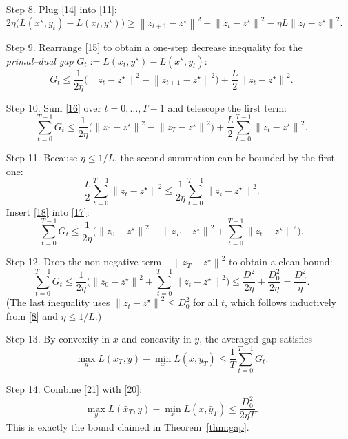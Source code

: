 \documentclass{article}
\newcommand{\norm}[1]{\left\lVert#1\right\rVert}
\begin{document}
\begin{enumerate}
\item[Step 8.] Plug \eqref{14} into \eqref{11}:
\[
2\eta\big(L(x^{\star},y_t)-L(x_t,y^{\star})\big)
\ge \norm{z_{t+1}-z^{\star}}^{2}-\norm{z_t-z^{\star}}^{2}-\eta L \norm{z_t-z^{\star}}^{2}.
\tag{15}
\]

\item[Step 9.] Rearrange \eqref{15} to obtain a one‑step decrease inequality for the \emph{primal–dual gap} $G_t:=L(x_t,y^{\star})-L(x^{\star},y_t)$:
\[
G_t\le \frac{1}{2\eta}\Big(\norm{z_t-z^{\star}}^{2}-\norm{z_{t+1}-z^{\star}}^{2}\Big)+\frac{L}{2}\norm{z_t-z^{\star}}^{2}.
\tag{16}
\]

\item[Step 10.] Sum \eqref{16} over $t=0,\dots,T-1$ and telescope the first term:
\[
\sum_{t=0}^{T-1}G_t
\le \frac{1}{2\eta}\big(\norm{z_0-z^{\star}}^{2}-\norm{z_T-z^{\star}}^{2}\big)
+\frac{L}{2}\sum_{t=0}^{T-1}\norm{z_t-z^{\star}}^{2}.
\tag{17}
\]

\item[Step 11.] Because $\eta\le 1/L$, the second summation can be bounded by the first one:
\[
\frac{L}{2}\sum_{t=0}^{T-1}\norm{z_t-z^{\star}}^{2}
\le \frac{1}{2\eta}\sum_{t=0}^{T-1}\norm{z_t-z^{\star}}^{2}.
\tag{18}
\]
Insert \eqref{18} into \eqref{17}:
\[
\sum_{t=0}^{T-1}G_t
\le \frac{1}{2\eta}\Big(\norm{z_0-z^{\star}}^{2}
-\norm{z_T-z^{\star}}^{2}
+\sum_{t=0}^{T-1}\norm{z_t-z^{\star}}^{2}\Big).
\tag{19}
\]

\item[Step 12.] Drop the non‑negative term $-\norm{z_T-z^{\star}}^{2}$ to obtain a clean bound:
\[
\sum_{t=0}^{T-1}G_t
\le \frac{1}{2\eta}\Big(\norm{z_0-z^{\star}}^{2}
+\sum_{t=0}^{T-1}\norm{z_t-z^{\star}}^{2}\Big)
\le \frac{D_0^{2}}{2\eta}+ \frac{D_0^{2}}{2\eta} = \frac{D_0^{2}}{\eta}.
\tag{20}
\]
(The last inequality uses $\norm{z_t-z^{\star}}^{2}\le D_0^{2}$ for all $t$, which follows inductively from \eqref{8} and $\eta\le 1/L$.)

\item[Step 13.] By convexity in $x$ and concavity in $y$, the averaged gap satisfies
\[
\max_{y}L(\bar{x}_T,y)-\min_{x}L(x,\bar{y}_T)
\le \frac{1}{T}\sum_{t=0}^{T-1}G_t.
\tag{21}
\]

\item[Step 14.] Combine \eqref{21} with \eqref{20}:
\[
\max_{y}L(\bar{x}_T,y)-\min_{x}L(x,\bar{y}_T)
\le \frac{D_0^{2}}{2\eta T}.
\tag{22}
\]
This is exactly the bound claimed in Theorem~\ref{thm:gap}.
\end{enumerate}
\end{document}
